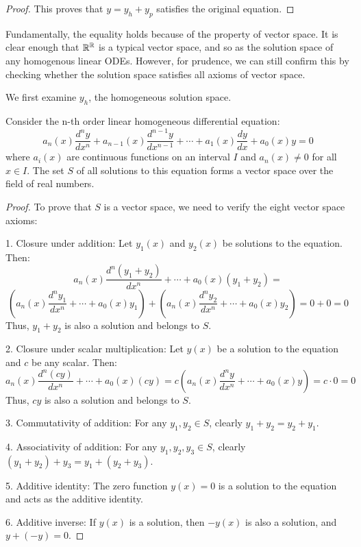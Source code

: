 \documentclass[12pt,a4paper]{article}
\begin{document}
\begin{remark}
\begin{proof}
   This proves that $y = y_h + y_p$ satisfies the original equation.
\end{proof}

Fundamentally, the equality holds because of the property of vector space.
It is clear enough that $\mathbb{R}^{\mathbb{R}}$ is a typical vector space, and so as the solution space of any homogenous linear ODEs. However, for prudence, we can still confirm this by checking whether the solution space satisfies all axioms of vector space.

We first examine $y_h$, the homogeneous solution space.
\begin{proposition}
Consider the n-th order linear homogeneous differential equation:
\[
a_n(x)\frac{d^ny}{dx^n} + a_{n-1}(x)\frac{d^{n-1}y}{dx^{n-1}} + \cdots + a_1(x)\frac{dy}{dx} + a_0(x)y = 0
\]
where $a_i(x)$ are continuous functions on an interval $I$ and $a_n(x) \neq 0$ for all $x \in I$. 
The set $S$ of all solutions to this equation forms a vector space over the field of real numbers.
\end{proposition}

\begin{proof}
To prove that $S$ is a vector space, we need to verify the eight vector space axioms:

1. Closure under addition: Let $y_1(x)$ and $y_2(x)$ be solutions to the equation. Then:
   \[
   a_n(x)\frac{d^n(y_1+y_2)}{dx^n} + \cdots + a_0(x)(y_1+y_2) = 
   \]
   \[
   \left(a_n(x)\frac{d^ny_1}{dx^n} + \cdots + a_0(x)y_1\right) + 
   \left(a_n(x)\frac{d^ny_2}{dx^n} + \cdots + a_0(x)y_2\right) = 0 + 0 = 0
   \]
   Thus, $y_1 + y_2$ is also a solution and belongs to $S$.

2. Closure under scalar multiplication: Let $y(x)$ be a solution to the equation and $c$ be any scalar. Then:
   \[
   a_n(x)\frac{d^n(cy)}{dx^n} + \cdots + a_0(x)(cy) = 
   c\left(a_n(x)\frac{d^ny}{dx^n} + \cdots + a_0(x)y\right) = c \cdot 0 = 0
   \]
   Thus, $cy$ is also a solution and belongs to $S$.

3. Commutativity of addition: For any $y_1, y_2 \in S$, clearly $y_1 + y_2 = y_2 + y_1$.

4. Associativity of addition: For any $y_1, y_2, y_3 \in S$, clearly $(y_1 + y_2) + y_3 = y_1 + (y_2 + y_3)$.

5. Additive identity: The zero function $y(x) = 0$ is a solution to the equation and acts as the additive identity.

6. Additive inverse: If $y(x)$ is a solution, then $-y(x)$ is also a solution, and $y + (-y) = 0$.


\end{proof}
\end{remark}
\end{document}
